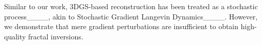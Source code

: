 Similar to our work, 3DGS-based reconstruction has been treated as a stochastic process____, akin to Stochastic Gradient Langevin Dynamics____. 
However, we demonstrate that mere gradient perturbations are insufficient to obtain high-quality fractal inversions.


